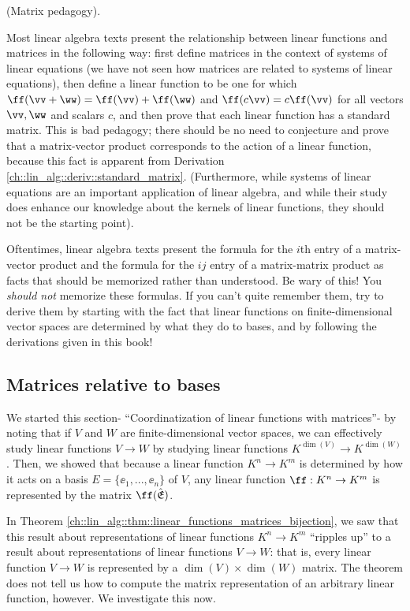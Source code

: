 \begin{remark}
    (Matrix pedagogy). 
    
    Most linear algebra texts present the relationship between linear functions and matrices in the following way: first define matrices in the context of systems of linear equations (we have not seen how matrices are related to systems of linear equations), then define a linear function to be one for which $\ff(\vv + \ww) = \ff(\vv) + \ff(\ww)$ and $\ff(c\vv) = c\ff(\vv)$ for all vectors $\vv, \ww$ and scalars $c$, and then prove that each linear function has a standard matrix. This is bad pedagogy; there should be no need to conjecture and prove that a matrix-vector product corresponds to the action of a linear function, because this fact is apparent from Derivation \ref{ch::lin_alg::deriv::standard_matrix}. (Furthermore, while systems of linear equations are an important application of linear algebra, and while their study does enhance our knowledge about the kernels of linear functions, they should not be the starting point).
    
    Oftentimes, linear algebra texts present the formula for the $i$th entry of a matrix-vector product and the formula for the $ij$ entry of a matrix-matrix product as facts that should be memorized rather than understood. Be wary of this! You \textit{should not} memorize these formulas. If you can't quite remember them, try to derive them by starting with the fact that linear functions on finite-dimensional vector spaces are determined by what they do to bases, and by following the derivations given in this book!
\end{remark}

\newpage

\subsection*{Matrices relative to bases}

We started this section- ``Coordinatization of linear functions with matrices''- by noting that if $V$ and $W$ are finite-dimensional vector spaces, we can effectively study linear functions $V \rightarrow W$ by studying linear functions $K^{\dim(V)} \rightarrow K^{\dim(W)}$. Then, we showed that because a linear function $K^n \rightarrow K^m$ is determined by how it acts on a basis $E = \{\ee_1, ..., \ee_n\}$ of $V$, any linear function $\ff:K^n \rightarrow K^m$ is represented by the matrix $\ff(\sE)$.

In Theorem \ref{ch::lin_alg::thm::linear_functions_matrices_bijection}, we saw that this result about representations of linear functions $K^n \rightarrow K^m$ ``ripples up'' to a result about representations of linear functions $V \rightarrow W$: that is, every linear function $V \rightarrow W$ is represented by a $\dim(V) \times \dim(W)$ matrix. The theorem does not tell us how to compute the matrix representation of an arbitrary linear function, however. We investigate this now.

